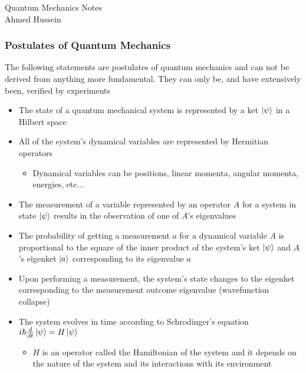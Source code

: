 \documentclass[8pt,t,mathserif,aspectratio=169]{beamer}
\newenvironment{nofootline}
{
    \setbeamertemplate{footline}{}
    \addtobeamertemplate{frametitle}{\vspace*{-0.9\baselineskip}}{}
}{}
\begin{document}
\begin{nofootline}
\begin{frame}
  \vspace{18mm}
  \begin{center}
  \Huge
  \textcolor{jhutext1}{Quantum Mechanics Notes} \\
  \LARGE
  \vspace{2mm}
  Ahmed Hussein \\
  \vspace{7mm}
  \end{center}
\end{frame}
\end{nofootline}

\begin{frame}
  \frametitle{Postulates of Quantum Mechanics}
  \vspace{1mm}
  The following statements are postulates of quantum mechanics and can not be derived from anything more fundamental. They can only be, and have extensively been, verified by experiments
  \begin{itemize}
    \item The state of a quantum mechanical system is represented by a ket $\ket{\psi}$ in a Hilbert space
    \item All of the system's dynamical variables are represented by Hermitian operators
    \begin{itemize}
      \item Dynamical variables can be positions, linear momenta, angular momenta, energies, etc...
    \end{itemize}
    \item The measurement of a variable represented by an operator $A$ for a system in state $\ket{\psi}$ results in the observation of one of $A$'s eigenvalues
    \item The probability of getting a measurement $a$ for a dynamical variable $A$ is proportional to the square of the inner product of the system's ket $\ket{\psi}$ and $A$'s eigenket $\ket{a}$ corresponding to its eigenvalue $a$
    \item Upon performing a measurement, the system's state changes to the eigenket corresponding to the measurement outcome eigenvalue (wavefunction collapse)
    \item The system evolves in time according to Schrodinger's equation $i \hbar {d \over dt} \ket{\psi} = H \ket{\psi}$
    \begin{itemize}
      \item $H$ is an operator called the Hamiltonian of the system and it depends on the nature of the system and its interactions with its environment
    \end{itemize}
  \end{itemize}
\end{frame}
\end{document}

